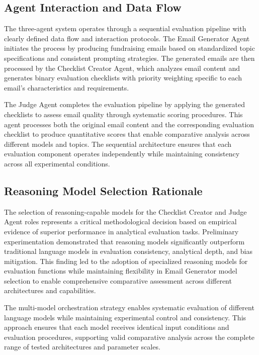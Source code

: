 \subsection{Agent Interaction and Data Flow}

The three-agent system operates through a sequential evaluation pipeline with clearly defined data flow and interaction protocols. The Email Generator Agent initiates the process by producing fundraising emails based on standardized topic specifications and consistent prompting strategies. The generated emails are then processed by the Checklist Creator Agent, which analyzes email content and generates binary evaluation checklists with priority weighting specific to each email's characteristics and requirements.

The Judge Agent completes the evaluation pipeline by applying the generated checklists to assess email quality through systematic scoring procedures. This agent processes both the original email content and the corresponding evaluation checklist to produce quantitative scores that enable comparative analysis across different models and topics. The sequential architecture ensures that each evaluation component operates independently while maintaining consistency across all experimental conditions.

\subsection{Reasoning Model Selection Rationale}

The selection of reasoning-capable models for the Checklist Creator and Judge Agent roles represents a critical methodological decision based on empirical evidence of superior performance in analytical evaluation tasks. Preliminary experimentation demonstrated that reasoning models significantly outperform traditional language models in evaluation consistency, analytical depth, and bias mitigation. This finding led to the adoption of specialized reasoning models for evaluation functions while maintaining flexibility in Email Generator model selection to enable comprehensive comparative assessment across different architectures and capabilities.

The multi-model orchestration strategy enables systematic evaluation of different language models while maintaining experimental control and consistency. This approach ensures that each model receives identical input conditions and evaluation procedures, supporting valid comparative analysis across the complete range of tested architectures and parameter scales.

